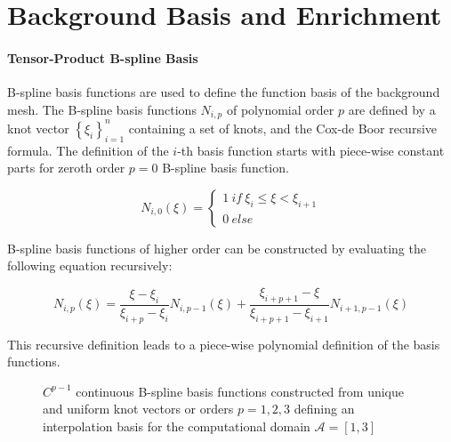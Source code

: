 \section{Background Basis and Enrichment}
\label{sec:overview_background}

\paragraph{Tensor-Product B-spline Basis}
B-spline basis functions are used to define the function basis of the background mesh. 
The B-spline basis functions $N_{i,p}$ of polynomial order $p$ are defined by a knot vector $\left\{\xi_i\right\}_{i = 1}^{n}$ containing a set of knots, and the Cox-de Boor recursive formula.  The definition of the $i$-th basis function starts with piece-wise constant parts for zeroth order $p=0$ B-spline basis function.

\vspace*{0.3cm}

\begin{equation} 
\label{eqn:BasisP0}
    N_{i,0}(\xi) = 
    \left\{
    \begin{array}{ll}1 \ if \ \xi_i \leq \xi < \xi_{i+1}\\  0\ else\end{array}
    \right.
\end{equation} 

B-spline basis functions of higher order can be constructed by evaluating the following equation recursively:
    
\begin{equation}
\label{eqn:CoxBoor}
    N_{i,p}(\xi) = 
    \frac{\xi - \xi_i}{\xi_{i+p} - \xi_i} N_{i,p-1}(\xi) + 
    \frac{\xi_{i+p+1} - \xi}{\xi_{i+p+1} - \xi_{i+1}} N_{i+1,p-1}(\xi)
\end{equation}

This recursive definition leads to a piece-wise polynomial definition of the basis functions. 

\begin{figure}[H]
    \begin{center}
    \def\svgwidth{13.0cm}
    
    \caption{$C^{p-1}$ continuous B-spline basis functions constructed from unique and uniform knot vectors or orders $p = {1,2,3}$ defining an interpolation basis for the computational domain $\mathcal{A} = [1,3]$} 
    \label{fig:Bsp_basis}
    \end{center}
\end{figure}

